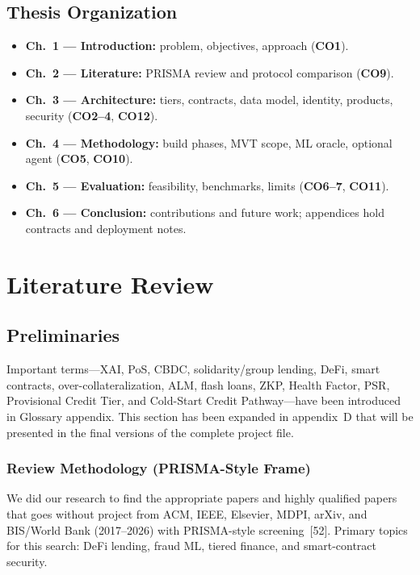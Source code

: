 \documentclass[12pt, a4paper]{report}
\begin{document}
\section{Thesis Organization}
\label{sec:thesis-organization}

\begin{itemize}[noitemsep]
\item \textbf{Ch.~1 --- Introduction:} problem, objectives, approach (\textbf{CO1}).
\item \textbf{Ch.~2 --- Literature:} PRISMA review and protocol comparison (\textbf{CO9}).
\item \textbf{Ch.~3 --- Architecture:} tiers, contracts, data model, identity, products, security (\textbf{CO2--4}, \textbf{CO12}).
\item \textbf{Ch.~4 --- Methodology:} build phases, MVT scope, ML oracle, optional agent (\textbf{CO5}, \textbf{CO10}).
\item \textbf{Ch.~5 --- Evaluation:} feasibility, benchmarks, limits (\textbf{CO6--7}, \textbf{CO11}).
\item \textbf{Ch.~6 --- Conclusion:} contributions and future work; appendices hold contracts and deployment notes.
\end{itemize}

\chapter{Literature Review}

\section{Preliminaries}
\label{sec:preliminaries}

Important terms---XAI, PoS, CBDC, solidarity/group lending, DeFi, smart contracts, over-collateralization, ALM, flash loans, ZKP, Health Factor, PSR, Provisional Credit Tier, and Cold-Start Credit Pathway---have been introduced in Glossary appendix. This section has been expanded in appendix~D that will be presented in the final versions of the complete project file.

\subsection{Review Methodology (PRISMA-Style Frame)}
\label{sec:lit-prisma}

We did our research to find the appropriate papers and highly qualified papers that goes without project from ACM, IEEE, Elsevier, MDPI, arXiv, and BIS/World Bank (2017--2026) with PRISMA-style screening~[52]. Primary topics for this search: DeFi lending, fraud ML, tiered finance, and smart-contract security.
\end{document}
